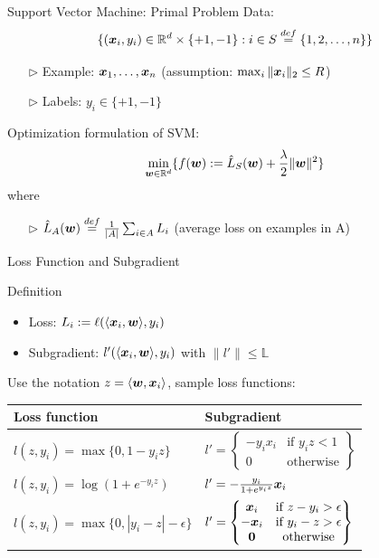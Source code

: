 \begin{frame}{Support Vector Machine: Primal Problem}
    Data: 
    \[
        \{(\bm{x}_i,y_i)\in \mathbb{R}^d \times \{+1, -1\}: i\in S \overset{def}{=} \{1,2,\ldots,n\}\}
    \]
    \begin{itemize}
        \item[$\rhd$] Example: $\bm{x}_1,\ldots,\bm{x}_n$ (assumption: $\max_i\|\bm{x}_i\|_2\le R$)
        \item[$\rhd$] Labels: $y_i \in\{+1,-1\}$
    \end{itemize}
    {\color{red} Optimization formulation of SVM:}
    \[
        \min_{\bm{w}\in\mathbb{R}^d} \{ f(\bm{w}):= \hat{L}_S(\bm{w})+\frac {\lambda} {2} \|\bm{w}\|^2 \}
    \]
    where 
    \begin{itemize}
        \item[$\rhd$] $\hat{L}_A(\bm{w}) \overset{def}{=} \frac{1}{|A|} \sum_{i\in A} L_i$ (average loss on examples in A)
    \end{itemize}
\end{frame}

\begin{frame}{Loss Function and Subgradient}
    \begin{block}{Definition}
        \begin{itemize}
            \item Loss: $L_i := \ell(\langle \bm{x}_i, \bm{w} \rangle, y_i)$

            \item Subgradient: $l'(\langle \bm{x}_i, \bm{w} \rangle, y_i)$ with $\|l'\| \le \mathbb{L}$
        \end{itemize}
    \end{block}
    Use the notation $z=\langle \bm{w}, \bm{x}_i\rangle$, sample loss functions:
    \begin{table}[h]
        \begin{tabular}{|l|l|}
            \hline
            Loss function & Subgradient  \\ \hline
            $l(z,y_i) = \max\{0,1-y_i z\}$ & $l' = \left\{
            \begin{matrix} -y_i x_i & \text{if } y_i z<1 \\ 
            0 & \text{otherwise}
            \end{matrix}
        \right\}$ \\ \hline
        $l(z,y_i) = \log(1+e^{-y_iz})$ & $l' = -\frac{y_i}{1+e^{y_i z}}\bm{x}_i$\\ \hline
        $l(z,y_i) = \max\{0, | y_i - z| - \epsilon\}$ & $l'=\left\{ 
        \begin{matrix}
            \bm{x}_i & \text{if } z-y_i > \epsilon \\
            -\bm{x}_i & \text{if } y_i-z > \epsilon \\
            \bm{0} & \text{otherwise}
        \end{matrix}
        \right\}$ \\ \hline
        \end{tabular}
    \end{table}
\end{frame}

